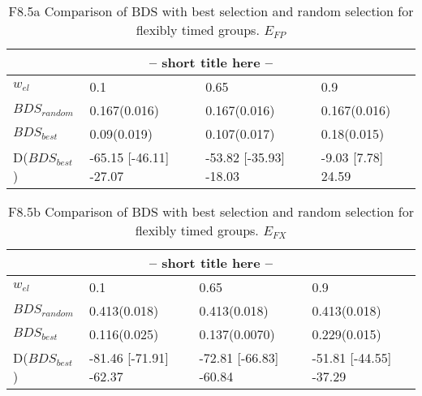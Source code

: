 \clearpage
\begin{landscape}
\begin{table}[h]
\label{at:xx}
\begin{center}
\begin{tabular}{llll}
\toprule
\multicolumn{4}{c}{-- short title here --}\\
\midrule
$w_{el}$ & 0.1 & 0.65 & 0.9\\
\midrule
$BDS_{random}$ & 0.167(0.016) & 0.167(0.016) & 0.167(0.016)\\
\midrule
$BDS_{best}$ & 0.09(0.019) & 0.107(0.017) & 0.18(0.015)\\
D($BDS_{best}$) & -65.15 [-46.11] -27.07 & -53.82 [-35.93] -18.03 & -9.03 [7.78] 24.59\\
\bottomrule
\end{tabular}
\end{center}
\caption{F8.5a Comparison of BDS with best selection and random selection for flexibly timed groups. $E_{FP}$}
\end{table}
\end{landscape}


\clearpage
\begin{landscape}
\begin{table}[h]
\label{at:xx}
\begin{center}
\begin{tabular}{llll}
\toprule
\multicolumn{4}{c}{-- short title here --}\\
\midrule
$w_{el}$ & 0.1 & 0.65 & 0.9\\
\midrule
$BDS_{random}$ & 0.413(0.018) & 0.413(0.018) & 0.413(0.018)\\
\midrule
$BDS_{best}$ & 0.116(0.025) & 0.137(0.0070) & 0.229(0.015)\\
D($BDS_{best}$) & -81.46 [-71.91] -62.37 & -72.81 [-66.83] -60.84 & -51.81 [-44.55] -37.29\\
\bottomrule
\end{tabular}
\end{center}
\caption{F8.5b Comparison of BDS with best selection and random selection for flexibly timed groups. $E_{FX}$}
\end{table}
\end{landscape}


